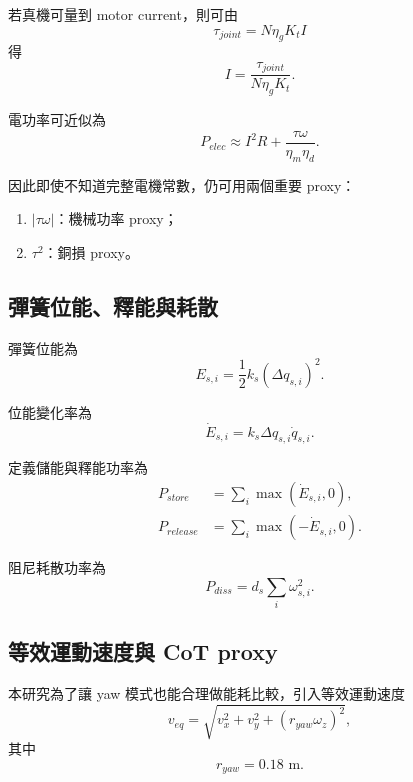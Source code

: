 \documentclass[12pt,a4paper,UTF8]{ctexart}
\begin{document}
若真機可量到 motor current，則可由
\begin{equation}
\tau_{joint} = N \eta_g K_t I
\end{equation}
得
\begin{equation}
I = \frac{\tau_{joint}}{N \eta_g K_t}.
\end{equation}

電功率可近似為
\begin{equation}
P_{elec} \approx I^2R + \frac{\tau \omega}{\eta_m \eta_d}.
\end{equation}

因此即使不知道完整電機常數，仍可用兩個重要 proxy：
\begin{enumerate}[leftmargin=2em]
    \item $|\tau \omega|$：機械功率 proxy；
    \item $\tau^2$：銅損 proxy。
\end{enumerate}

\subsection{彈簧位能、釋能與耗散}

彈簧位能為
\begin{equation}
E_{s,i} = \frac{1}{2}k_s(\Delta q_{s,i})^2.
\end{equation}

位能變化率為
\begin{equation}
\dot{E}_{s,i} = k_s \Delta q_{s,i} \dot{q}_{s,i}.
\end{equation}

定義儲能與釋能功率為
\begin{align}
P_{store} &= \sum_i \max(\dot{E}_{s,i}, 0), \\
P_{release} &= \sum_i \max(-\dot{E}_{s,i}, 0).
\end{align}

阻尼耗散功率為
\begin{equation}
P_{diss} = d_s \sum_i \omega_{s,i}^2.
\end{equation}

\subsection{等效運動速度與 CoT proxy}

本研究為了讓 yaw 模式也能合理做能耗比較，引入等效運動速度
\begin{equation}
v_{eq} = \sqrt{v_x^2 + v_y^2 + (r_{yaw}\omega_z)^2},
\end{equation}
其中
\begin{equation}
r_{yaw} = 0.18 \text{ m}.
\end{equation}
\end{document}
